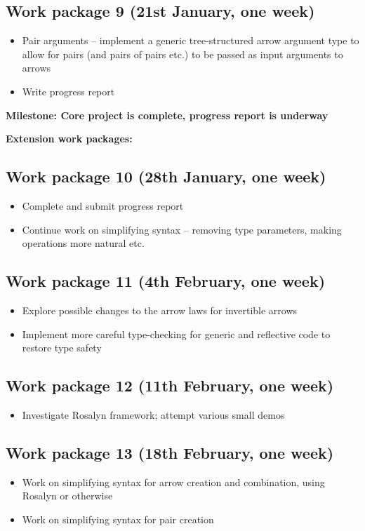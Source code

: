 	\subsection*{Work package 9 (21st January, one week)}
		\begin{itemize}
			\item Pair arguments -- implement a generic tree-structured arrow argument type to allow for pairs (and pairs of pairs etc.) to be passed as input arguments to arrows
			\item Write progress report
		\end{itemize}
	
	\noindent \textbf{Milestone: Core project is complete, progress report is underway}
	
	\noindent \textbf{Extension work packages:}
	
	\subsection*{Work package 10 (28th January, one week)}
		\begin{itemize}
			\item Complete and submit progress report
			\item Continue work on simplifying syntax -- removing type parameters, making operations more natural etc.
		\end{itemize}
	
	\subsection*{Work package 11 (4th February, one week)}
		\begin{itemize}
			\item Explore possible changes to the arrow laws for invertible arrows
			\item Implement more careful type-checking for generic and reflective code to restore type safety
		\end{itemize}
	
	\subsection*{Work package 12 (11th February, one week)}
		\begin{itemize}
			\item Investigate Rosalyn framework; attempt various small demos
		\end{itemize}
	
	\subsection*{Work package 13 (18th February, one week)}
		\begin{itemize}
			\item Work on simplifying syntax for arrow creation and combination, using Rosalyn or otherwise
			\item Work on simplifying syntax for pair creation
		\end{itemize}
	
